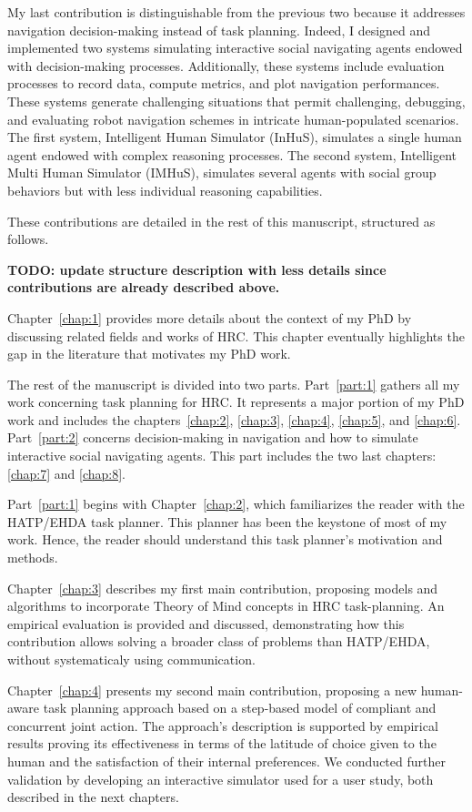 My last contribution is distinguishable from the previous two because it addresses navigation decision-making instead of task planning. Indeed, I designed and implemented two systems simulating interactive social navigating agents endowed with decision-making processes. Additionally, these systems include evaluation processes to record data, compute metrics, and plot navigation performances. These systems generate challenging situations that permit challenging, debugging, and evaluating robot navigation schemes in intricate human-populated scenarios. The first system, Intelligent Human Simulator (InHuS), simulates a single human agent endowed with complex reasoning processes. The second system, Intelligent Multi Human Simulator (IMHuS), simulates several agents with social group behaviors but with less individual reasoning capabilities. 

These contributions are detailed in the rest of this manuscript, structured as follows.

\textbf{TODO: update structure description with less details since contributions are already described above.}

Chapter~\ref{chap:1} provides more details about the context of my PhD by discussing related fields and works of HRC. This chapter eventually highlights the gap in the literature that motivates my PhD work.

The rest of the manuscript is divided into two parts. Part~\ref{part:1} gathers all my work concerning task planning for HRC. It represents a major portion of my PhD work and includes the chapters~\ref{chap:2}, \ref{chap:3}, \ref{chap:4}, \ref{chap:5}, and \ref{chap:6}. Part~\ref{part:2} concerns decision-making in navigation and how to simulate interactive social navigating agents. This part includes the two last chapters: \ref{chap:7} and \ref{chap:8}.

Part~\ref{part:1} begins with Chapter~\ref{chap:2}, which familiarizes the reader with the HATP/EHDA task planner. This planner has been the keystone of most of my work. Hence, the reader should understand this task planner's motivation and methods.

Chapter~\ref{chap:3} describes my first main contribution, proposing models and algorithms to incorporate Theory of Mind concepts in HRC task-planning. An empirical evaluation is provided and discussed, demonstrating how this contribution allows solving a broader class of problems than HATP/EHDA, without systematicaly using communication.

Chapter~\ref{chap:4} presents my second main contribution, proposing a new human-aware task planning approach based on a step-based model of compliant and concurrent joint action. The approach's description is supported by empirical results proving its effectiveness in terms of the latitude of choice given to the human and the satisfaction of their internal preferences. We conducted further validation by developing an interactive simulator used for a user study, both described in the next chapters.

